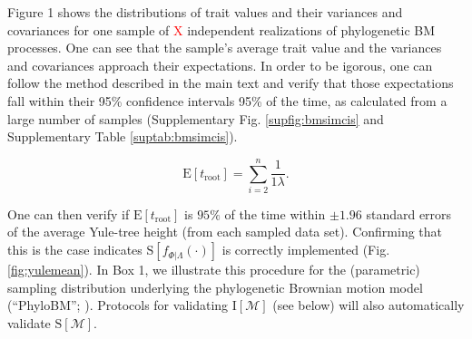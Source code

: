 \documentclass[oneside]{article}
\begin{document}
\begin{tcolorbox}[breakable, width=\textwidth, colback=gray!10, boxrule=0pt,
  title=Box 1: Models characterized by well-known parametric distributions, fonttitle=\bfseries]
Figure 1 shows the distributions of trait values and their variances
and covariances for one sample of \textcolor{red}{X} independent
realizations of phylogenetic BM processes.
One can see that the sample's average trait value and the
variances and covariances approach their expectations.
In order to be igorous, one can follow the method described
in the main text and verify that those expectations fall within
their 95\% confidence intervals 95\% of the time, as calculated
from a large number of samples (Supplementary Fig. \ref{supfig:bmsimcis} and
Supplementary Table \ref{suptab:bmsimcis}).
%
%
\end{tcolorbox}

\begin{equation}
  \text{E}[t_{\text{root}}] = \sum_{i=2}^{n}\frac{1}{1\lambda}.
  \label{eq:yule}
\end{equation}

\noindent One can then verify if $\text{E}[t_{\text{root}}]$ is $95\%$
of the time within $\pm 1.96$ standard errors of the average
Yule-tree height (from each sampled data set).
Confirming that this is the case indicates $\text{S}[f_{\Phi|\Lambda}(\cdot)]$ is correctly
implemented (Fig. \ref{fig:yulemean}).
In Box 1, we illustrate this procedure for the (parametric) sampling distribution
underlying the phylogenetic Brownian motion model (``PhyloBM''; \citealp{felsenstein73}).
Protocols for validating $\text{I}[\mathcal{M}]$ (see below) will also automatically validate
$\text{S}[\mathcal{M}]$.
\end{document}
